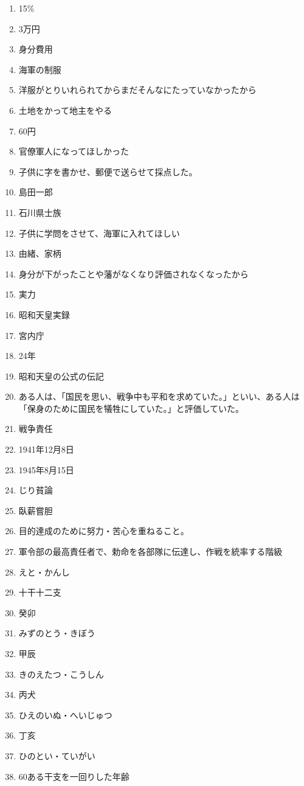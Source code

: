 \documentclass[]{jsarticle}
\begin{document}
\begin{enumerate}
	\item 15\%
	\item 3万円
	\item 身分費用
	\item 海軍の制服
	\item 洋服がとりいれられてからまだそんなにたっていなかったから
	\item 土地をかって地主をやる
	\item 60円
	\item 官僚軍人になってほしかった
	\item 子供に字を書かせ、郵便で送らせて採点した。
	\item 島田一郎
	\item 石川県士族
	\item 子供に学問をさせて、海軍に入れてほしい
	\item 由緒、家柄
	\item 身分が下がったことや藩がなくなり評価されなくなったから
	\item 実力
		\\
	\item 昭和天皇実録
	\item 宮内庁
	\item 24年
	\item 昭和天皇の公式の伝記
	\item ある人は、「国民を思い、戦争中も平和を求めていた。」といい、ある人は「保身のために国民を犠牲にしていた。」と評価していた。
	\item 戦争責任
	\item 1941年12月8日
	\item 1945年8月15日
	\item じり貧論
	\item 臥薪嘗胆
	\item 目的達成のために努力・苦心を重ねること。
	\item 軍令部の最高責任者で、勅命を各部隊に伝達し、作戦を統率する階級
		\\
	\item えと・かんし
	\item 十干十二支
	\item 癸卯
	\item みずのとう・きぼう
	\item 甲辰
	\item きのえたつ・こうしん
	\item 丙犬
	\item ひえのいぬ・へいじゅつ
	\item 丁亥
	\item ひのとい・ていがい
	\item 60ある干支を一回りした年齢

\end{enumerate}
\end{document}
